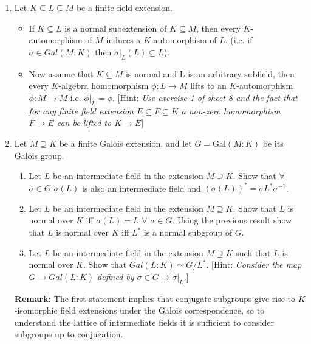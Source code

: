 \documentclass[12pt,a4paper]{article}
\begin{document}
 

\begin{enumerate} 
\item 
Let $K\subseteq L\subseteq M$ be a finite field extension. 

\begin{itemize}
    \item If $K\subseteq L$ is a normal subextension of $K\subseteq M$, then every $K$-automorphism of $M$ induces a $K$-automorphism of $L$. (i.e. if $\sigma\in Gal(M:K)$ then $\sigma|_L(L)\subseteq L$).
    \item Now assume that $K\subseteq M$ is normal and L is an arbitrary subfield, then every $K$-algebra homomorphism $\phi:L\xrightarrow{}M$ lifts to an $K$-automorphism $\widetilde{\phi}:M\xrightarrow{}M$ i.e. $\widetilde{\phi}|_L=\phi$. [Hint: \textit{Use exercise 1 of sheet 8 and the fact that for any finite field extension $E\subseteq F \subseteq K$ a non-zero homomorphism $F\xrightarrow{} \overline{E}$ can be lifted to $K\xrightarrow{} \overline{E}$}]
\end{itemize}{}

\item 
Let $M\supseteq K$ be a finite Galois extension, and let $G=$Gal$(M:K)$ be its Galois group. 
\begin{enumerate}
    \item Let $L$ be an intermediate field in the extension $M\supseteq K$. Show that $\forall$ $\sigma\in G$ $\sigma(L)$ is also an intermediate field and $(\sigma(L))^*=\sigma L^* \sigma^{-1}$.  
    \item Let $L$ be an intermediate field in the extension $M\supseteq K$. Show that $L$ is normal over $K$ iff $\sigma(L)=L$ $\forall$ $\sigma\in G$. Using the previous result show that $L$ is normal over $K$ iff $L^*$ is a normal subgroup of $G$.
    \item Let $L$ be an intermediate field in the extension $M\supseteq K$ such that $L$ is normal over $K$. Show that $Gal(L:K)\simeq G/L^*$.
    [Hint: \textit{Consider the map $G\xrightarrow{}Gal(L:K)$ defined by $\sigma\in G\mapsto \sigma|_{L}$.}]
    
\end{enumerate}{}

\textbf{Remark:} The first statement implies that conjugate subgroups give rise to $K$-isomorphic field extensions under the Galois correspondence, so to understand the lattice of intermediate fields it is sufficient to consider subgroups up to conjugation.\\


\end{enumerate}
\end{document}
